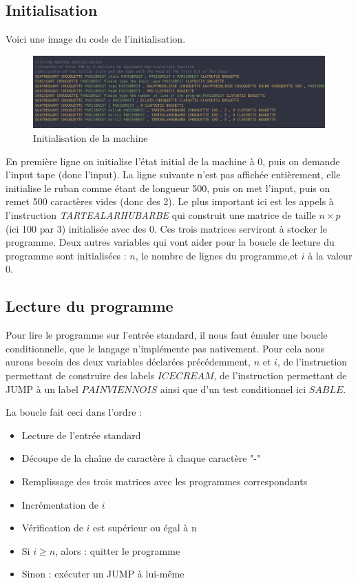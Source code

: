 \documentclass[11pt,colorlinks=true,a4paper]{article}
\begin{document}
    \subsection{Initialisation}
    Voici une image du code de l'initialisation.
    \begin{figure}[H]
        \begin{center}
        \includegraphics[width=\textwidth]{img/init.png}
        \caption{Initialisation de la machine}
        \end{center}
    \end{figure}
    En première ligne on initialise l'état initial de la machine à 0, puis on demande l'input tape (donc l'input). La ligne suivante n'est 
    pas affichée entièrement, elle initialise le ruban comme étant de longueur 500, puis on met l'input, puis on remet 500 caractères vides (donc des 2).
    Le plus important ici est les appels à l'instruction \textit{TARTEALARHUBARBE} qui construit une matrice de taille $n\times p$ (ici 100 par 3) initialisée 
    avec des 0. Ces trois matrices serviront à stocker le programme.
    Deux autres variables qui vont aider pour la boucle de lecture du programme sont initialisées : $n$, le nombre de lignes du programme,et $i$ à la valeur 0. 
    \subsection{Lecture du programme}
    Pour lire le programme sur l'entrée standard, il nous faut émuler une boucle conditionnelle, que le langage n'implémente pas nativement. 
    Pour cela nous aurons besoin des deux variables déclarées précédemment, $n$ et $i$, de l'instruction permettant de construire des labels $ICECREAM$,
    de l'instruction permettant de JUMP à un label $PAINVIENNOIS$ ainsi que d'un test conditionnel ici $SABLE$.\par 
    \bigskip 

    La boucle fait ceci dans l'ordre : 
    \begin{itemize}
        \item Lecture de l'entrée standard 
        \item Découpe de la chaîne de caractère à chaque caractère "-" 
        \item Remplissage des trois matrices avec les programmes correspondants
        \item Incrémentation de $i$
        \item Vérification de $i$ est supérieur ou égal à n
        \item Si $i\geq n$, alors : quitter le programme 
        \item Sinon : exécuter un JUMP à lui-même
    \end{itemize}
\end{document}
